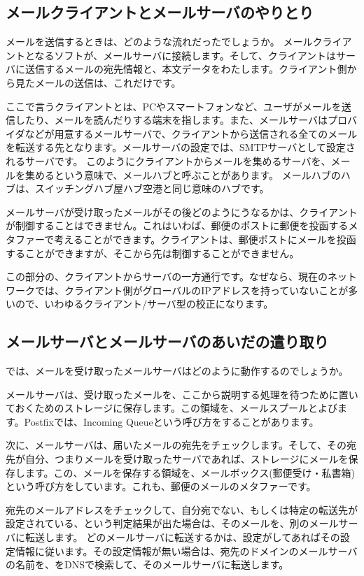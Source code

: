 \subsection{メールクライアントとメールサーバのやりとり}

メールを送信するときは、どのような流れだったでしょうか。
メールクライアントとなるソフトが、メールサーバに接続します。そして、クライアントはサーバに送信するメールの宛先情報と、本文データをわたします。クライアント側から見たメールの送信は、これだけです。

ここで言うクライアントとは、PCやスマートフォンなど、ユーザがメールを送信したり、メールを読んだりする端末を指します。また、メールサーバはプロバイダなどが用意するメールサーバで、クライアントから送信される全てのメールを転送する先となります。メールサーバの設定では、SMTPサーバとして設定されるサーバです。
このようにクライアントからメールを集めるサーバを、メールを集めるという意味で、メールハブと呼ぶことがあります。
メールハブのハブは、スイッチングハブ屋ハブ空港と同じ意味のハブです。


メールサーバが受け取ったメールがその後どのようにうなるかは、クライアントが制御することはできません。これはいわば、郵便のポストに郵便を投函するメタファーで考えることができます。クライアントは、郵便ポストにメールを投函することができますが、そこから先は制御することができません。

この部分の、クライアントからサーバの一方通行です。なぜなら、現在のネットワークでは、クライアント側がグローバルのIPアドレスを持っていないことが多いので、いわゆるクライアント/サーバ型の校正になります。


\subsection{メールサーバとメールサーバのあいだの遣り取り}

では、メールを受け取ったメールサーバはどのように動作するのでしょうか。

メールサーバは、受け取ったメールを、ここから説明する処理を待つために置いておくためのストレージに保存します。この領域を、メールスプールとよびます。Postfixでは、Incoming Queueという呼び方をすることがあります。

次に、メールサーバは、届いたメールの宛先をチェックします。そして、その宛先が自分、つまりメールを受け取ったサーバであれば、ストレージにメールを保存します。この、メールを保存する領域を、メールボックス(郵便受け・私書箱)という呼び方をしています。これも、郵便のメールのメタファーです。

宛先のメールアドレスをチェックして、自分宛でない、もしくは特定の転送先が設定されている、という判定結果が出た場合は、そのメールを、別のメールサーバに転送します。
どのメールサーバに転送するかは、設定がしてあればその設定情報に従います。その設定情報が無い場合は、宛先のドメインのメールサーバの名前を、をDNSで検索して、そのメールサーバに転送します。

